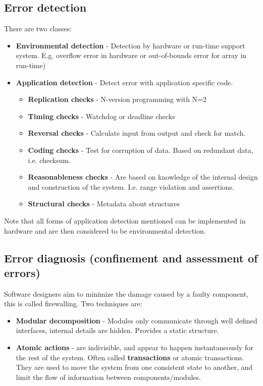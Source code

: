 \subsection{Error detection}
There are two classes:
\begin{itemize}
\item \textbf{Environmental detection} - Detection by hardware or run-time support system. E.g. overflow error in hardware or out-of-bounds error for array in run-time)
\item \textbf{Application detection} - Detect error with application specific code.
\begin{itemize}
    \item \textbf{Replication checks} - N-version programming with N=2
\item \textbf{Timing checks} - Watchdog or deadline checks
\item \textbf{Reversal checks} - Calculate input from output and check for match.
\item \textbf{Coding checks} - Test for corruption of data. Based on redundant data, i.e. checksum.
\item \textbf{Reasonableness checks} - Are based on knowledge of the internal design and construction of the system. I.e. range violation and assertions.
\item \textbf{Structural checks} - Metadata about structures
\end{itemize}
\end{itemize}
Note that all forms of application detection mentioned can be implemented in hardware and are then considered to be environmental detection.

\subsection{Error diagnosis (confinement and assessment of errors)}
Software designers aim to minimize the damage caused by a faulty component, this is called firewalling. Two techniques are:
\begin{itemize}
\item \textbf{Modular decomposition} - Modules only communicate through well defined interfaces, internal details are hidden. Provides a static structure.
\item \textbf{Atomic actions} - are indivisible, and appear to happen instantaneously for the rest of the system. Often called \textbf{transactions} or atomic transactions. They are used to move the system from one consistent state to another, and limit the flow of information between components/modules.
\end{itemize}

